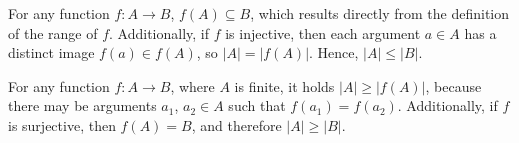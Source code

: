 \subexercise
For any function $f:A\to B$, $f(A)\subseteq B$, which results directly from the definition of the range of $f$\!.
Additionally, if $f$ is injective, then each argument $a\in A$ has a distinct image $f(a)\in f(A)$, so $|A|=|f(A)|$.
Hence, $|A|\le|B|$.

\subexercise
For any function $f:A\to B$, where $A$ is finite, it holds $|A|\ge|f(A)|$, because there may be arguments $a_1$, $a_2\in A$ such that $f(a_1)=f(a_2)$.
Additionally, if $f$ is surjective, then $f(A)=B$, and therefore $|A|\ge|B|$.
